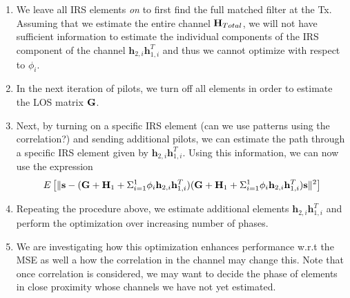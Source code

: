 \documentclass[12pt,a4paper]{report}
\begin{document}
\begin{enumerate}
\item
We leave all IRS elements \emph{on} to first find the full matched filter at the Tx. Assuming that we estimate the entire channel $\mathbf{H}_{Total}$, we will not have sufficient information to estimate the individual components of the IRS component of the channel $\mathbf{h}_{2,i}\mathbf{h}^T_{1,i}$ and thus we cannot optimize with respect to $\phi_i $.
\item
	In the next iteration of pilots, we turn off all elements in order to estimate the LOS matrix $\mathbf{G} $.
\item
	Next, by turning on a specific IRS element (can we use patterns using the correlation?) and sending additional pilots, we can estimate 
	the path through a specific IRS element given by $\mathbf{h}_{2,i}\mathbf{h}^T_{1,i}$.
	Using this information, we can now use the expression 
	\begin{equation}
E\left[\|  \mathbf{s} - (\mathbf{G} +  \mathbf{H}_1 + \Sigma_{i=1}^{1} \phi_i \mathbf{h}_{2,i}\mathbf{h}^T_{1,i})(\mathbf{G} +  \mathbf{H}_1 + \Sigma_{i=1}^{1} \phi_i \mathbf{h}_{2,i}\mathbf{h}^T_{1,i})\mathbf{s}  \|^2 \right]
\end{equation}
	\item
		Repeating the procedure above, we estimate additional elements $\mathbf{h}_{2,i}\mathbf{h}^T_{1,i}$ and perform the optimization over increasing number of phases.
	\item 
		We are investigating how this optimization enhances performance w.r.t the MSE as well a how the correlation in the channel may change this. 
		Note that once correlation is considered, we may want to decide the phase of elements in close proximity whose channels we have not yet estimated.
\end{enumerate}
\end{document}
